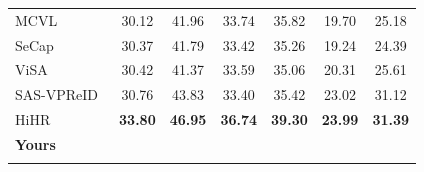 \documentclass[runningheads]{llncs}
\makeatletter
\let\leaderboards@table\table
\let\leaderboards@endtable\endtable
\renewenvironment{table}[1][]{\leaderboards@table[H]}{\leaderboards@endtable}
\makeatother
\begin{document}
\begin{table}[t]
\begin{tabular}{lcccccc}
    MCVL                             & 30.12                                & 41.96                  & 33.74                   & 35.82                  & 19.70                   & 25.18                  \\
    SeCap~\cite{wang2025secap}       & 30.37                                & 41.79                  & 33.42                   & 35.26                  & 19.24                   & 24.39                  \\
    ViSA~\cite{zhang2026view}        & 30.42                                & 41.37                  & 33.59                   & 35.06                  & 20.31                   & 25.61                  \\
    SAS-VPReID~\cite{yang2026sas}    & 30.76                                & 43.83                  & 33.40                   & 35.42                  & 23.02                   & 31.12                  \\
    HiHR~\cite{yang2026hihr}         & \textbf{33.80}                       & \textbf{46.95}         & \textbf{36.74}          & \textbf{39.30}         & \textbf{23.99}          & \textbf{31.39}         \\
    \Xhline{0.6pt}
    \rowcolor{gray!15}
    \textbf{Yours}                   & \textbf{}                            & \textbf{}              & \textbf{}               & \textbf{}              & \textbf{}               & \textbf{}              \\
    \Xhline{1.0pt}
  \end{tabular}
\end{table}
\end{document}
